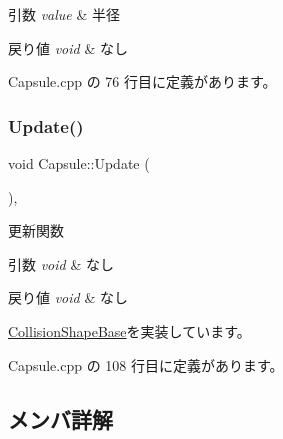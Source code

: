 \begin{DoxyParams}{引数}
{\em value} & 半径 \\
\hline
\end{DoxyParams}

\begin{DoxyRetVals}{戻り値}
{\em void} & なし \\
\hline
\end{DoxyRetVals}


 Capsule.\+cpp の 76 行目に定義があります。

\mbox{\label{class_capsule_abfa1026590603a2971c5269171a50864}} 
\subsubsection{\texorpdfstring{Update()}{Update()}}
{\footnotesize\ttfamily void Capsule\+::\+Update (\begin{DoxyParamCaption}{ }\end{DoxyParamCaption})\hspace{0.3cm}{\ttfamily [override]}, {\ttfamily [virtual]}}



更新関数 


\begin{DoxyParams}{引数}
{\em void} & なし \\
\hline
\end{DoxyParams}

\begin{DoxyRetVals}{戻り値}
{\em void} & なし \\
\hline
\end{DoxyRetVals}


\mbox{\hyperlink{class_collision_shape_base_a7aaa0f4de4e208f168f78e3445313929}{Collision\+Shape\+Base}}を実装しています。



 Capsule.\+cpp の 108 行目に定義があります。



\subsection{メンバ詳解}
\mbox{\label{class_capsule_a7b7f46d36a0d810555aa5eb62da6a8ed}} 
